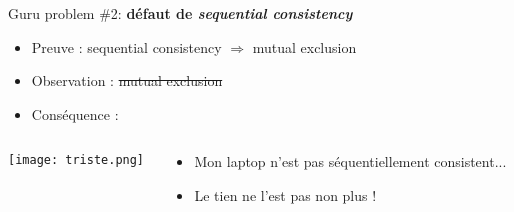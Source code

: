 \documentclass[xcolor={x11names,svgnames},x11names,svgnames]{beamer}
\begin{document}

\begin{frame}[label=peterson_report1, fragile]

  \begin{block}{Guru problem \#2: \bfseries défaut de \emph{sequential consistency}}

    \begin{itemize}
    \item Preuve : sequential consistency $\Rightarrow$ mutual exclusion
    \item Observation : \sout{mutual exclusion}
    \item Conséquence : 
    \end{itemize}
    
    \begin{columns}[c]
    \begin{column}{.1\textwidth}
      \texttt{[image: triste.png]}
    \end{column}
    \begin{column}{.9\textwidth}
      \begin{itemize}
      \item Mon laptop n'est pas séquentiellement consistent...
        \pause
      \item Le tien ne l'est pas non plus !
      \end{itemize}
    \end{column}
  \end{columns}

\end{block}
\end{frame}


\end{document}

